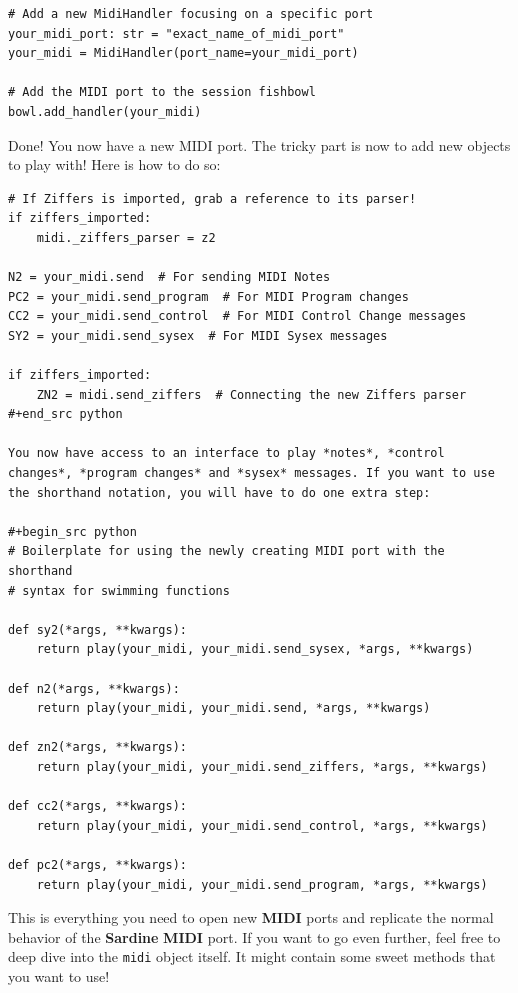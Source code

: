 \documentclass[11pt]{article}
\begin{document}
\begin{verbatim}
# Add a new MidiHandler focusing on a specific port
your_midi_port: str = "exact_name_of_midi_port"
your_midi = MidiHandler(port_name=your_midi_port)

# Add the MIDI port to the session fishbowl
bowl.add_handler(your_midi)
\end{verbatim}

Done! You now have a new MIDI port. The tricky part is now to add new objects to play with! Here is how to do so:

\begin{verbatim}
# If Ziffers is imported, grab a reference to its parser!
if ziffers_imported:
    midi._ziffers_parser = z2

N2 = your_midi.send  # For sending MIDI Notes
PC2 = your_midi.send_program  # For MIDI Program changes
CC2 = your_midi.send_control  # For MIDI Control Change messages
SY2 = your_midi.send_sysex  # For MIDI Sysex messages

if ziffers_imported:
    ZN2 = midi.send_ziffers  # Connecting the new Ziffers parser
#+end_src python

You now have access to an interface to play *notes*, *control changes*, *program changes* and *sysex* messages. If you want to use the shorthand notation, you will have to do one extra step:

#+begin_src python
# Boilerplate for using the newly creating MIDI port with the shorthand
# syntax for swimming functions

def sy2(*args, **kwargs):
    return play(your_midi, your_midi.send_sysex, *args, **kwargs)

def n2(*args, **kwargs):
    return play(your_midi, your_midi.send, *args, **kwargs)

def zn2(*args, **kwargs):
    return play(your_midi, your_midi.send_ziffers, *args, **kwargs)

def cc2(*args, **kwargs):
    return play(your_midi, your_midi.send_control, *args, **kwargs)

def pc2(*args, **kwargs):
    return play(your_midi, your_midi.send_program, *args, **kwargs)
\end{verbatim}

This is everything you need to open new \textbf{MIDI} ports and replicate the normal behavior of the \textbf{Sardine} \textbf{MIDI} port. If you want to go even further, feel free to deep dive into the \texttt{midi} object itself. It might contain some sweet methods that you want to use!
\end{document}
